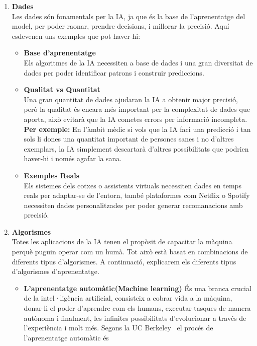 \begin{enumerate}
    \item \textbf{Dades}\\
    Les dades són fonamentals per la IA, ja que és la base de l'aprenentatge del model, per poder raonar, prendre decisions, i millorar la precisió. Aquí esdevenen uns exemples que pot haver-hi:
         \begin{itemize}
            \item \textbf{Base d'aprenentatge}\\
            Els algoritmes de la IA necessiten a base de dades i una gran diversitat de dades per poder identificar patrons i construir prediccions.

           \item \textbf{Qualitat vs Quantitat}\\
            Una gran quantitat de dades ajudaran la IA a obtenir major precisió, però la qualitat és encara més important per la complexitat de dades que aporta, això evitarà que la IA cometes errors per informació incompleta.\textbf{ Per exemple:} En l'àmbit mèdic si vols que la IA faci una predicció i tan sols li dones una quantitat important de persones sanes i no d'altres exemplars, la IA simplement descartarà d'altres possibilitats que podrien haver-hi i només agafar la sana.

            \item \textbf{Exemples Reals}\\
            Els sistemes dels cotxes o assistents virtuals necessiten dades en temps reals per adaptar-se de l'entorn, també plataformes com Netflix o Spotify necessiten dades personalitzades per poder generar recomanacions amb precisió.
          \end{itemize}

    \item \textbf{Algorismes}\\
  Totes les aplicacions de la IA tenen el propòsit de capacitar la màquina perquè puguin operar com un humà. Tot això està basat en combinacions de diferents tipus d’algorismes. A continuació, explicarem els diferents tipus d’algorismes d’aprenentatge.
        \begin{itemize}
           \item \textbf{L'aprenentatge automàtic(Machine learning)}\label{Aprenentatge_automàtic}
            És una branca crucial de la intel·ligència artificial, consisteix a cobrar vida a la màquina, donar-li el poder d'aprendre com els humans, executar tasques de manera autònoma i finalment, les infinites possibilitats d'evolucionar a través de l'experiència i molt més. Segons la UC Berkeley~\cite{Berkeley} el procés de l'aprenentatge automàtic és


\end{itemize}
\end{enumerate}
